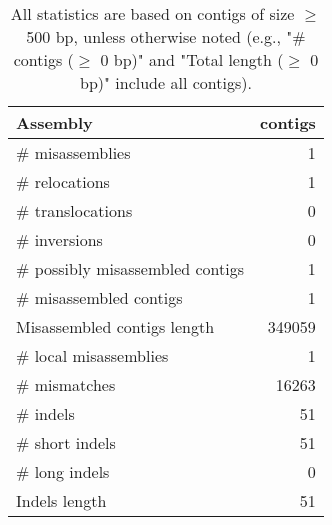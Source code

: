 \documentclass[12pt,a4paper]{article}
\begin{document}
\begin{table}[ht]
\begin{center}
\caption{All statistics are based on contigs of size $\geq$ 500 bp, unless otherwise noted (e.g., "\# contigs ($\geq$ 0 bp)" and "Total length ($\geq$ 0 bp)" include all contigs).}
\begin{tabular}{|l*{1}{|r}|}
\hline
Assembly & contigs \\ \hline
\# misassemblies & 1 \\ \hline
\hspace{5mm}\# relocations & 1 \\ \hline
\hspace{5mm}\# translocations & 0 \\ \hline
\hspace{5mm}\# inversions & 0 \\ \hline
\# possibly misassembled contigs & 1 \\ \hline
\# misassembled contigs & 1 \\ \hline
Misassembled contigs length & 349059 \\ \hline
\# local misassemblies & 1 \\ \hline
\# mismatches & 16263 \\ \hline
\# indels & 51 \\ \hline
\hspace{5mm}\# short indels & 51 \\ \hline
\hspace{5mm}\# long indels & 0 \\ \hline
Indels length & 51 \\ \hline
\end{tabular}
\end{center}
\end{table}
\end{document}
